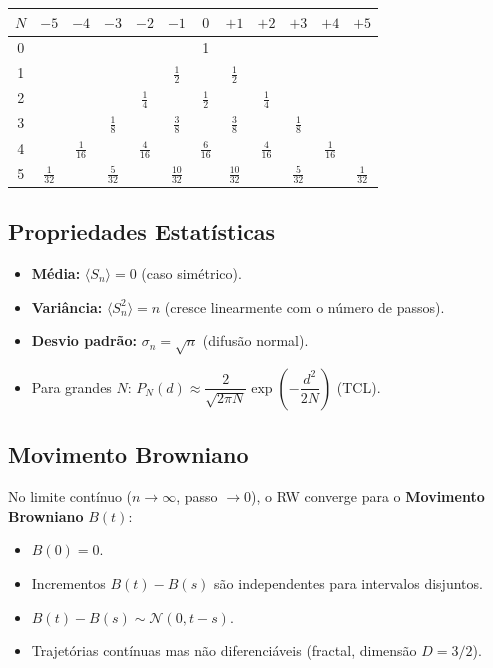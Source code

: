 \documentclass[12pt,a4paper]{article}
\begin{document}
\begin{center}
\begin{tabular}{c|ccccccccccc}
\toprule
$N$ & $-5$ & $-4$ & $-3$ & $-2$ & $-1$ & $0$ & $+1$ & $+2$ & $+3$ & $+4$ & $+5$ \\
\midrule
0 & & & & & & 1 & & & & & \\
1 & & & & & $\tfrac{1}{2}$ & & $\tfrac{1}{2}$ & & & & \\
2 & & & & $\tfrac{1}{4}$ & & $\tfrac{1}{2}$ & & $\tfrac{1}{4}$ & & & \\
3 & & & $\tfrac{1}{8}$ & & $\tfrac{3}{8}$ & & $\tfrac{3}{8}$ & & $\tfrac{1}{8}$ & & \\
4 & & $\tfrac{1}{16}$ & & $\tfrac{4}{16}$ & & $\tfrac{6}{16}$ & & $\tfrac{4}{16}$ & & $\tfrac{1}{16}$ & \\
5 & $\tfrac{1}{32}$ & & $\tfrac{5}{32}$ & & $\tfrac{10}{32}$ & & $\tfrac{10}{32}$ & & $\tfrac{5}{32}$ & & $\tfrac{1}{32}$ \\
\bottomrule
\end{tabular}
\end{center}

\subsection{Propriedades Estat\'isticas}

\begin{itemize}
  \item \textbf{M\'edia:} $\langle S_n \rangle = 0$ (caso sim\'etrico).
  \item \textbf{Vari\^ancia:} $\langle S_n^2 \rangle = n$ (cresce linearmente com o n\'umero de passos).
  \item \textbf{Desvio padr\~ao:} $\sigma_n = \sqrt{n}$ (difus\~ao normal).
  \item Para grandes $N$: $P_N(d) \approx \dfrac{2}{\sqrt{2\pi N}}\exp\!\left(-\dfrac{d^2}{2N}\right)$ (TCL).
\end{itemize}

\subsection{Movimento Browniano}

No limite cont\'inuo ($n \to \infty$, passo $\to 0$), o RW converge para o \textbf{Movimento Browniano} $B(t)$:
\begin{itemize}
  \item $B(0) = 0$.
  \item Incrementos $B(t) - B(s)$ s\~ao independentes para intervalos disjuntos.
  \item $B(t) - B(s) \sim \mathcal{N}(0, t-s)$.
  \item Trajet\'orias cont\'inuas mas n\~ao diferenci\'aveis (fractal, dimens\~ao $D = 3/2$).
\end{itemize}
\end{document}
